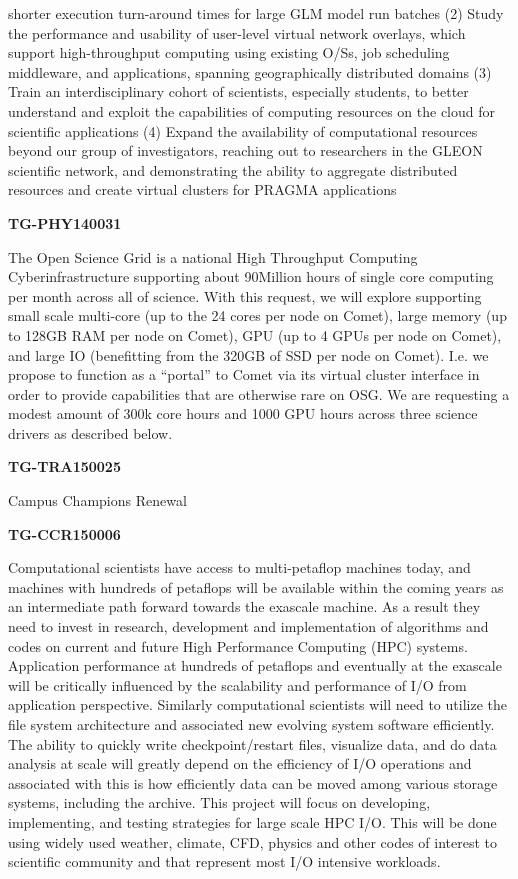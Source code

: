 shorter execution turn-around times for large GLM model run batches (2)
Study the performance and usability of user-level virtual network
overlays, which support high-throughput computing using existing O/Ss,
job scheduling middleware, and applications, spanning geographically
distributed domains (3) Train an interdisciplinary cohort of scientists,
especially students, to better understand and exploit the capabilities
of computing resources on the cloud for scientific applications (4)
Expand the availability of computational resources beyond our group of
investigators, reaching out to researchers in the GLEON scientific
network, and demonstrating the ability to aggregate distributed
resources and create virtual clusters for PRAGMA applications

\textbf{TG-PHY140031}

The Open Science Grid is a national High Throughput Computing
Cyberinfrastructure supporting about 90Million hours of single core
computing per month across all of science. With this request, we will
explore supporting small scale multi-core (up to the 24 cores per node
on Comet), large memory (up to 128GB RAM per node on Comet), GPU (up to
4 GPUs per node on Comet), and large IO (benefitting from the 320GB of
SSD per node on Comet). I.e. we propose to function as a ``portal'' to
Comet via its virtual cluster interface in order to provide capabilities
that are otherwise rare on OSG. We are requesting a modest amount of
300k core hours and 1000 GPU hours across three science drivers as
described below.

\textbf{TG-TRA150025}

Campus Champions Renewal

\textbf{TG-CCR150006}

Computational scientists have access to multi-petaflop machines today,
and machines with hundreds of petaflops will be available within the
coming years as an intermediate path forward towards the exascale
machine. As a result they need to invest in research, development and
implementation of algorithms and codes on current and future High
Performance Computing (HPC) systems. Application performance at hundreds
of petaflops and eventually at the exascale will be critically
influenced by the scalability and performance of I/O from application
perspective. Similarly computational scientists will need to utilize the
file system architecture and associated new evolving system software
efficiently. The ability to quickly write checkpoint/restart files,
visualize data, and do data analysis at scale will greatly depend on the
efficiency of I/O operations and associated with this is how efficiently
data can be moved among various storage systems, including the archive.
This project will focus on developing, implementing, and testing
strategies for large scale HPC I/O. This will be done using widely used
weather, climate, CFD, physics and other codes of interest to scientific
community and that represent most I/O intensive workloads.

